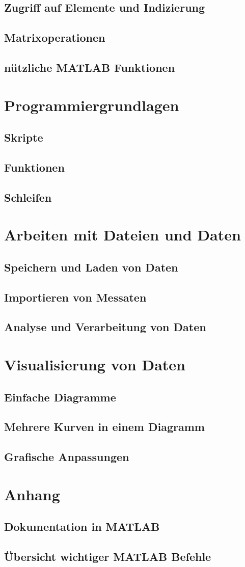 \documentclass[12pt, a4paper, twoside]{article}
\begin{document}
        \subsection{Zugriff auf Elemente und Indizierung}
        \subsection{Matrixoperationen}
        \subsection{nützliche MATLAB Funktionen}
    \section{Programmiergrundlagen}
        \subsection{Skripte}
        \subsection{Funktionen}
        \subsection{Schleifen}
    \section{Arbeiten mit Dateien und Daten}
        \subsection{Speichern und Laden von Daten}
        \subsection{Importieren von Messaten}
        \subsection{Analyse und Verarbeitung von Daten}
    \section{Visualisierung von Daten}
        \subsection{Einfache Diagramme}
        \subsection{Mehrere Kurven in einem Diagramm}
        \subsection{Grafische Anpassungen}
    \section{Anhang}
        \subsection{Dokumentation in MATLAB}
        \subsection{Übersicht wichtiger MATLAB Befehle}
\end{document}
